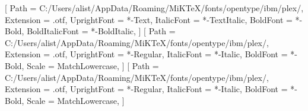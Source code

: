 
\usepackage{microtype}
\usepackage{graphicx}
\usepackage{fontspec}
\usepackage{marginnote}
\usepackage{sidenotes}
\usepackage{unicode-math}
\usepackage[dvipsnames]{xcolor}


\setmainfont{IBMPlexSerif}[
  Path           = C:/Users/alist/AppData/Roaming/MiKTeX/fonts/opentype/ibm/plex/,
  Extension      = .otf,
  UprightFont    = *-Text,
  ItalicFont     = *-TextItalic,
  BoldFont       = *-Bold,
  BoldItalicFont = *-BoldItalic,
]
\setsansfont{IBMPlexSans}[
  Path           = C:/Users/alist/AppData/Roaming/MiKTeX/fonts/opentype/ibm/plex/,
  Extension      = .otf,
  UprightFont    = *-Regular,
  ItalicFont     = *-Italic,
  BoldFont       = *-Bold,
  Scale          = MatchLowercase,
]
\setmonofont{IBMPlexMono}[
  Path           = C:/Users/alist/AppData/Roaming/MiKTeX/fonts/opentype/ibm/plex/,
  Extension      = .otf,
  UprightFont    = *-Regular,
  ItalicFont     = *-Italic,
  BoldFont       = *-Bold,
  Scale          = MatchLowercase,
]


\renewcommand*{\marginfont}{\sffamily\footnotesize\color{atlas!80!black}}

\renewcommand{\baselinestretch}{1.30}
\setlength{\parskip}{0.6\baselineskip}
\setlength{\parindent}{0pt}

